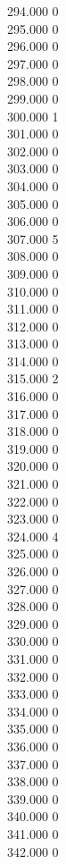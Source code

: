 { 294.000	0 \\
 295.000	0 \\
 296.000	0 \\
 297.000	0 \\
 298.000	0 \\
 299.000	0 \\
 300.000	1 \\
 301.000	0 \\
 302.000	0 \\
 303.000	0 \\
 304.000	0 \\
 305.000	0 \\
 306.000	0 \\
 307.000	5 \\
 308.000	0 \\
 309.000	0 \\
 310.000	0 \\
 311.000	0 \\
 312.000	0 \\
 313.000	0 \\
 314.000	0 \\
 315.000	2 \\
 316.000	0 \\
 317.000	0 \\
 318.000	0 \\
 319.000	0 \\
 320.000	0 \\
 321.000	0 \\
 322.000	0 \\
 323.000	0 \\
 324.000	4 \\
 325.000	0 \\
 326.000	0 \\
 327.000	0 \\
 328.000	0 \\
 329.000	0 \\
 330.000	0 \\
 331.000	0 \\
 332.000	0 \\
 333.000	0 \\
 334.000	0 \\
 335.000	0 \\
 336.000	0 \\
 337.000	0 \\
 338.000	0 \\
 339.000	0 \\
 340.000	0 \\
 341.000	0 \\
 342.000	0 \\
}
